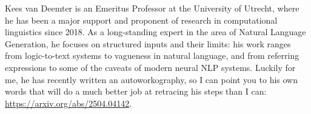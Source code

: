 Kees van Deemter is an Emeritus Professor at the University of Utrecht, where he has been a major support and proponent of research in computational linguistics since 2018.
As a long-standing expert in the area of Natural Language Generation, he focuses on structured inputs and their limits: his work ranges from logic-to-text systems to vagueness in natural language, and from referring expressions to some of the caveats of modern neural NLP systems.
Luckily for me, he has recently written an autoworkography, so I can point you to his own words that will do a much better job at retracing his steps than I can: \url{https://arxiv.org/abs/2504.04142}.
